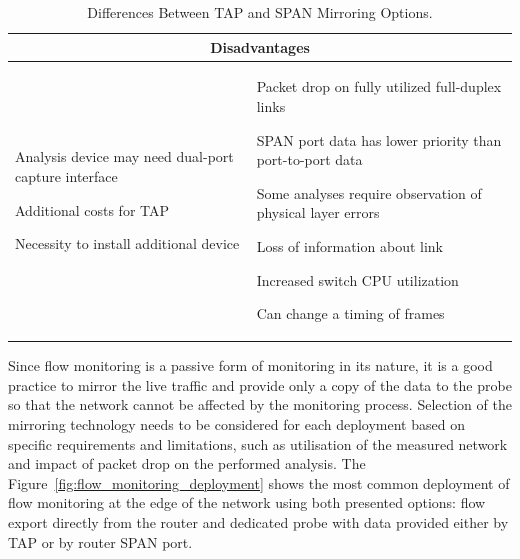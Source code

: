 \begin{table}[t!]
\begin{tabularx}{\textwidth}{XX}
        \multicolumn{2}{c}{Disadvantages} \\ \midrule
        \begin{compactitem}
            \item Analysis device may need dual-port capture interface
            \item Additional costs for TAP
            \item Necessity to install additional device
        \end{compactitem}
        & 
        \begin{compactitem}
            \item Packet drop on fully utilized full-duplex links
            \item SPAN port data has lower priority than port-to-port data
            \item Some analyses require observation of physical layer errors
            \item Loss of information about link
            \item Increased switch CPU utilization
            \item Can change a timing of frames
        \end{compactitem}
        \\ \bottomrule
    \end{tabularx}
    \caption{Differences Between TAP and SPAN Mirroring Options.}
    \label{tab:tap_vs_span}
\end{table}

Since flow monitoring is a passive form of monitoring in its nature, it is a good practice to mirror the live traffic and provide only a copy of the data to the probe so that the network cannot be affected by the monitoring process. Selection of the mirroring technology needs to be considered for each deployment based on specific requirements and limitations, such as utilisation of the measured network and impact of packet drop on the performed analysis. The Figure~\ref{fig:flow_monitoring_deployment} shows the most common deployment of flow monitoring at the edge of the network using both presented options: flow export directly from the router and dedicated probe with data provided either by TAP or by router SPAN port.

